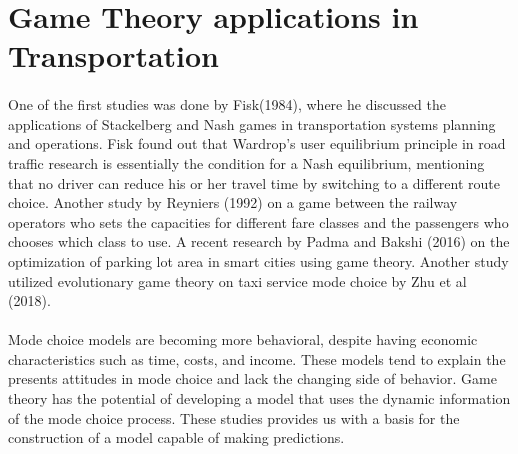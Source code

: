 \section{Game Theory applications in Transportation}
\paragraph{} One of the first studies was done by Fisk(1984), where he discussed the applications of Stackelberg and Nash games in transportation systems planning and operations. Fisk found out that Wardrop's user equilibrium principle in road traffic research is essentially the condition for a Nash equilibrium, mentioning that no driver can reduce his or her travel time by switching to a different route choice. Another study by Reyniers (1992) on a game between the railway operators who sets the capacities for different fare classes and the passengers who chooses which class to use. A recent research by Padma and Bakshi (2016) on the optimization of parking lot area in smart cities using game theory. Another study utilized evolutionary game theory on taxi service mode choice by Zhu et al (2018).  

\paragraph{}
Mode choice models are becoming more behavioral, despite having economic characteristics such as time, costs, and income.  These models tend to explain the presents attitudes in mode choice and lack the changing side of behavior. Game theory has the potential of developing a model that uses the dynamic information of the mode choice process. These studies provides us with a basis for the construction of a model capable of making predictions.
